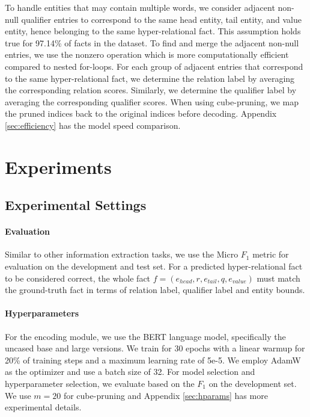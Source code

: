 \documentclass[11pt]{article}
\begin{document}
To handle entities that may contain multiple words, we consider adjacent non-null qualifier entries to correspond to the same head entity, tail entity, and value entity, hence belonging to the same hyper-relational fact. 
This assumption holds true for 97.14\% of facts in the dataset.
To find and merge the adjacent non-null entries, we use the nonzero operation which is more computationally efficient compared to nested for-loops.
For each group of adjacent entries that correspond to the same hyper-relational fact, we determine the relation label by averaging the corresponding relation scores.
Similarly, we determine the qualifier label by averaging the corresponding qualifier scores.
When using cube-pruning, we map the pruned indices back to the original indices before decoding.
Appendix \ref{sec:efficiency} has the model speed comparison.





\section{Experiments}

\subsection{Experimental Settings}

\paragraph{Evaluation} 
Similar to other information extraction tasks, we use the Micro $F_1$ metric for evaluation on the development and test set.
For a predicted hyper-relational fact to be considered correct, the whole fact $f = (e_{head}, r, e_{tail}, q, e_{value})$ must match the ground-truth fact in terms of relation label, qualifier label and entity bounds.


\paragraph{Hyperparameters} 
For the encoding module, we use the BERT language model, specifically the uncased base and large versions. 
We train for 30 epochs with a linear warmup for 20\% of training steps and a maximum learning rate of 5e-5. 
We employ AdamW as the optimizer and use a batch size of 32. 
For model selection and hyperparameter selection, we evaluate based on the $F_1$ on the development set.
We use $m=20$ for cube-pruning and Appendix \ref{sec:hparams} has more experimental details.
\end{document}
